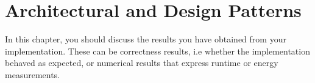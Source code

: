 \chapter{Architectural and Design Patterns}
In this chapter, you should discuss the results you have obtained from your implementation.
These can be correctness results, i.e whether the implementation behaved as expected, or numerical results that express runtime or energy measurements.